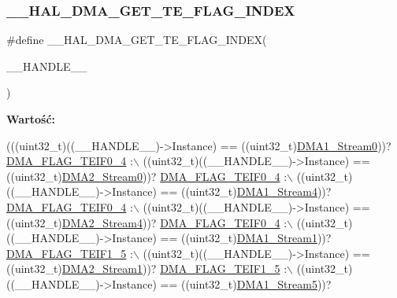\subsubsection{\texorpdfstring{\+\_\+\+\_\+\+H\+A\+L\+\_\+\+D\+M\+A\+\_\+\+G\+E\+T\+\_\+\+T\+E\+\_\+\+F\+L\+A\+G\+\_\+\+I\+N\+D\+EX}{\_\_HAL\_DMA\_GET\_TE\_FLAG\_INDEX}}
{\footnotesize\ttfamily \#define \+\_\+\+\_\+\+H\+A\+L\+\_\+\+D\+M\+A\+\_\+\+G\+E\+T\+\_\+\+T\+E\+\_\+\+F\+L\+A\+G\+\_\+\+I\+N\+D\+EX(\begin{DoxyParamCaption}\item[{}]{\+\_\+\+\_\+\+H\+A\+N\+D\+L\+E\+\_\+\+\_\+ }\end{DoxyParamCaption})}

{\bfseries Wartość\+:}
\begin{DoxyCode}
(((uint32\_t)((\_\_HANDLE\_\_)->Instance) == ((uint32\_t)\hyperlink{group___peripheral__declaration_ga61247dd5d594289c404dd8774202dfd8}{DMA1\_Stream0}))? 
      \hyperlink{group___d_m_a__flag__definitions_gab98ef70ba0c1498d4c967a10b3f6e67f}{DMA\_FLAG\_TEIF0\_4} :\(\backslash\)
 ((uint32\_t)((\_\_HANDLE\_\_)->Instance) == ((uint32\_t)\hyperlink{group___peripheral__declaration_ga3a2efe5fd7a7a79be3b08a1670bbd016}{DMA2\_Stream0}))? 
      \hyperlink{group___d_m_a__flag__definitions_gab98ef70ba0c1498d4c967a10b3f6e67f}{DMA\_FLAG\_TEIF0\_4} :\(\backslash\)
 ((uint32\_t)((\_\_HANDLE\_\_)->Instance) == ((uint32\_t)\hyperlink{group___peripheral__declaration_ga87df45f4b82e0b3a8c1b17f1a77aecdb}{DMA1\_Stream4}))? 
      \hyperlink{group___d_m_a__flag__definitions_gab98ef70ba0c1498d4c967a10b3f6e67f}{DMA\_FLAG\_TEIF0\_4} :\(\backslash\)
 ((uint32\_t)((\_\_HANDLE\_\_)->Instance) == ((uint32\_t)\hyperlink{group___peripheral__declaration_gae32674772021620800275dd3b6d62c2f}{DMA2\_Stream4}))? 
      \hyperlink{group___d_m_a__flag__definitions_gab98ef70ba0c1498d4c967a10b3f6e67f}{DMA\_FLAG\_TEIF0\_4} :\(\backslash\)
 ((uint32\_t)((\_\_HANDLE\_\_)->Instance) == ((uint32\_t)\hyperlink{group___peripheral__declaration_gaf7d82f110f19982d483eebc465d222b2}{DMA1\_Stream1}))? 
      \hyperlink{group___d_m_a__flag__definitions_ga9d4c5bac7bdcdb23b4d38186e918ae9e}{DMA\_FLAG\_TEIF1\_5} :\(\backslash\)
 ((uint32\_t)((\_\_HANDLE\_\_)->Instance) == ((uint32\_t)\hyperlink{group___peripheral__declaration_gae96f15d34d3c41c16fce69bc2878151a}{DMA2\_Stream1}))? 
      \hyperlink{group___d_m_a__flag__definitions_ga9d4c5bac7bdcdb23b4d38186e918ae9e}{DMA\_FLAG\_TEIF1\_5} :\(\backslash\)
 ((uint32\_t)((\_\_HANDLE\_\_)->Instance) == ((uint32\_t)\hyperlink{group___peripheral__declaration_gac3abc20f80e25c19b02104ad34eae652}{DMA1\_Stream5}))? 

\end{DoxyCode}
